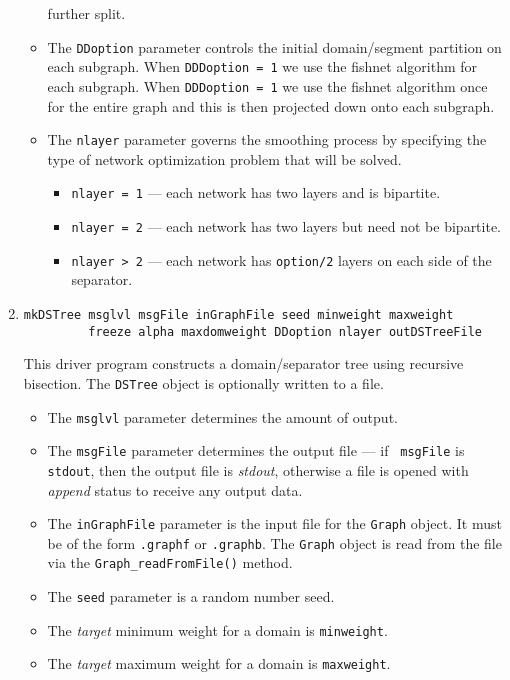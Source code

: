 \begin{enumerate}
\begin{itemize}
further split.
\item
The {\tt DDoption} parameter controls the initial domain/segment
partition on each subgraph.
When {\tt DDDoption = 1} we use the fishnet algorithm for each
subgraph.
When {\tt DDDoption = 1} we use the fishnet algorithm once for the
entire graph and this is then projected down onto each subgraph.
\item
The {\tt nlayer} parameter governs the smoothing process by specifying 
the type of network optimization problem that will be solved.
\begin{itemize}
\item
{\tt nlayer = 1} --- each network has two layers and is bipartite.
\item
{\tt nlayer = 2} 
--- each network has two layers but need not be bipartite.
\item
{\tt nlayer > 2} --- each network has {\tt option/2} layers
on each side of the separator.
\end{itemize}
\end{itemize}
\item
\begin{verbatim}
mkDSTree msglvl msgFile inGraphFile seed minweight maxweight
         freeze alpha maxdomweight DDoption nlayer outDSTreeFile
\end{verbatim}
This driver program constructs a domain/separator tree using
recursive bisection. 
The {\tt DSTree} object is optionally written to a file.
\par
\begin{itemize}
\item
The {\tt msglvl} parameter determines the amount of output.
\item
The {\tt msgFile} parameter determines the output file --- if {\tt
msgFile} is {\tt stdout}, then the output file is {\it stdout},
otherwise a file is opened with {\it append} status to receive any
output data.
\item
The {\tt inGraphFile} parameter is the input file for the {\tt Graph}
object. It must be of the form {\tt *.graphf} or {\tt *.graphb}.
The {\tt Graph} object is read from the file via the
{\tt Graph\_readFromFile()} method.
\item
The {\tt seed} parameter is a random number seed.
\item
The {\it target} minimum weight for a domain is {\tt minweight}.
\item
The {\it target} maximum weight for a domain is {\tt maxweight}.

\end{itemize}
\end{enumerate}
